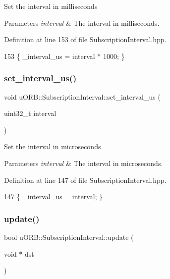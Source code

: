 Set the interval in milliseconds 
\begin{DoxyParams}{Parameters}
{\em interval} & The interval in milliseconds. \\
\hline
\end{DoxyParams}


Definition at line 153 of file Subscription\+Interval.\+hpp.


\begin{DoxyCode}
153 \{ \_interval\_us = interval * 1000; \}
\end{DoxyCode}
\mbox{\label{classuORB_1_1SubscriptionInterval_a53018b44bb431a80d47ac95327990b2a}} 
\subsubsection{\texorpdfstring{set\+\_\+interval\+\_\+us()}{set\_interval\_us()}}
{\footnotesize\ttfamily void u\+O\+R\+B\+::\+Subscription\+Interval\+::set\+\_\+interval\+\_\+us (\begin{DoxyParamCaption}\item[{uint32\+\_\+t}]{interval }\end{DoxyParamCaption})\hspace{0.3cm}{\ttfamily [inline]}}

Set the interval in microseconds 
\begin{DoxyParams}{Parameters}
{\em interval} & The interval in microseconds. \\
\hline
\end{DoxyParams}


Definition at line 147 of file Subscription\+Interval.\+hpp.


\begin{DoxyCode}
147 \{ \_interval\_us = interval; \}
\end{DoxyCode}
\mbox{\label{classuORB_1_1SubscriptionInterval_ac9198cc23c666df10af2a8fb3f809508}} 
\subsubsection{\texorpdfstring{update()}{update()}}
{\footnotesize\ttfamily bool u\+O\+R\+B\+::\+Subscription\+Interval\+::update (\begin{DoxyParamCaption}\item[{void $\ast$}]{dst }\end{DoxyParamCaption})\hspace{0.3cm}{\ttfamily [inline]}}

